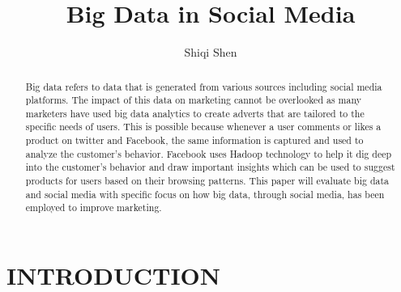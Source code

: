 \documentclass[sigconf]{acmart}
\begin{document}
\title{Big Data in Social Media}


\author{Shiqi Shen}


\begin{abstract}

Big data refers to data that is generated from various sources including social media platforms. The impact of this data on marketing cannot be overlooked as many marketers have used big data analytics to create adverts that are tailored to the specific needs of users. This is possible because whenever a user comments or likes a product on twitter and Facebook, the same information is captured and used to analyze the customer’s behavior. Facebook uses Hadoop technology to help it dig deep into the customer’s behavior and draw important insights which can be used to suggest products for users based on their browsing patterns. This paper will evaluate big data and social media with specific focus on how big data, through social media, has been employed to improve marketing.
    
\end{abstract}


\maketitle

\section{INTRODUCTION}
\end{document}
